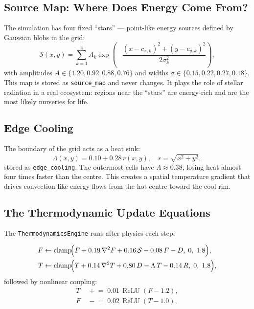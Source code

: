 \documentclass[12pt,a4paper]{article}
\DeclareMathOperator{\clamp}{clamp}
\DeclareMathOperator{\relu}{ReLU}
\begin{document}
\subsection{Source Map: Where Does Energy Come From?}

The simulation has four fixed ``stars'' — point-like energy sources
defined by Gaussian blobs in the grid:
\[
  \mathcal{S}(x,y) = \sum_{k=1}^{4} A_k
  \exp\!\left(-\frac{(x-c_{x,k})^2 + (y-c_{y,k})^2}{2\sigma_k^2}\right),
\]
with amplitudes $A \in \{1.20, 0.92, 0.88, 0.76\}$
and widths $\sigma \in \{0.15, 0.22, 0.27, 0.18\}$.
This map is stored as \texttt{source\_map} and never changes.
It plays the role of stellar radiation in a real ecosystem:
regions near the ``stars'' are energy-rich
and are the most likely nurseries for life.

\subsection{Edge Cooling}

The boundary of the grid acts as a heat sink:
\[
  \Lambda(x,y) = 0.10 + 0.28\,r(x,y),\quad r = \sqrt{x^2+y^2},
\]
stored as \texttt{edge\_cooling}.
The outermost cells have $\Lambda \approx 0.38$,
losing heat almost four times faster than the centre.
This creates a spatial temperature gradient that drives
convection-like energy flows from the hot centre toward the cool rim.

\subsection{The Thermodynamic Update Equations}

The \texttt{ThermodynamicsEngine} runs after physics each step:

\begin{tcolorbox}[mathbox={Free energy and heat evolution}]
\begin{align}
  F &\leftarrow \clamp\!\Bigl(
    F + 0.19\,\nabla^2 F + 0.16\,\mathcal{S}
    - 0.08\,F - D,\;0,\;1.8\Bigr), \label{eq:F}\\
  T &\leftarrow \clamp\!\Bigl(
    T + 0.14\,\nabla^2 T + 0.80\,D
    - \Lambda\,T - 0.14\,R,\;0,\;1.8\Bigr), \label{eq:T}
\end{align}
followed by nonlinear coupling:
\begin{align}
  T &\;\mathrel{+}=\; 0.01\,\relu(F - 1.2), \\
  F &\;\mathrel{-}=\; 0.02\,\relu(T - 1.0),
\end{align}
\end{tcolorbox}
\end{document}
